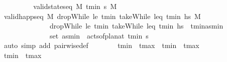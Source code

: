 \begin{isabellebody}
\ \ \ \ \ \ \isamarkupfalse%
\ \isamarkupfalse%
\ {\isachardoublequoteopen}valid{\isacharunderscore}{\kern0pt}state{\isacharunderscore}{\kern0pt}seq\ M\ {\isacharbrackleft}{\kern0pt}t\isactrlsub m\isactrlsub i\isactrlsub n{\isacharbrackright}{\kern0pt}\ {\isasympi}s\ M\isanewline
\ \ \ \ \ \ \ \ \isamarkupfalse%
\ {\isacartoucheopen}valid{\isacharunderscore}{\kern0pt}happ{\isacharunderscore}{\kern0pt}seq\ M\ {\isacharparenleft}{\kern0pt}dropWhile\ {\isacharparenleft}{\kern0pt}le\ t\isactrlsub m\isactrlsub i\isactrlsub n{\isacharparenright}{\kern0pt}\ {\isacharparenleft}{\kern0pt}takeWhile\ {\isacharparenleft}{\kern0pt}leq\ t\isactrlsub m\isactrlsub i\isactrlsub n{\isacharparenright}{\kern0pt}\ hs{\isacharparenright}{\kern0pt}{\isacharparenright}{\kern0pt}\ M\isanewline
\ \ \ \ \ \ \ \ \ \ \ \ \ \ {\isacartoucheopen}dropWhile\ {\isacharparenleft}{\kern0pt}le\ t\isactrlsub m\isactrlsub i\isactrlsub n{\isacharparenright}{\kern0pt}\ {\isacharparenleft}{\kern0pt}takeWhile\ {\isacharparenleft}{\kern0pt}leq\ t\isactrlsub m\isactrlsub i\isactrlsub n{\isacharparenright}{\kern0pt}\ hs{\isacharparenright}{\kern0pt}\ {\isacharequal}{\kern0pt}\ {\isacharbrackleft}{\kern0pt}{\isacharparenleft}{\kern0pt}t\isactrlsub m\isactrlsub i\isactrlsub n{\isacharcomma}{\kern0pt}as\isactrlsub m\isactrlsub i\isactrlsub n{\isacharparenright}{\kern0pt}{\isacharbrackright}{\kern0pt}{\isacartoucheclose}\ \isanewline
\ \ \ \ \ \ \ \ \ \ \ \ \ \ {\isacartoucheopen}set\ as\isactrlsub m\isactrlsub i\isactrlsub n\ {\isacharequal}{\kern0pt}\ acts{\isacharunderscore}{\kern0pt}of{\isacharunderscore}{\kern0pt}plan{\isacharunderscore}{\kern0pt}at\ t\isactrlsub m\isactrlsub i\isactrlsub n\ {\isasympi}s{\isacartoucheclose}\isanewline
\ \ \ \ \ \ \ \ \isamarkupfalse%
\ {\isacharparenleft}{\kern0pt}auto\ simp\ add{\isacharcolon}{\kern0pt}\ pairwise{\isacharunderscore}{\kern0pt}def{\isacharparenright}{\kern0pt}\isanewline
\isanewline
\ \ \ \ \ \ \isamarkupfalse%
\ {\isachardoublequoteopen}t\isactrlsub m\isactrlsub i\isactrlsub n\ {\isacharequal}{\kern0pt}\ t\isactrlsub m\isactrlsub a\isactrlsub x\ {\isasymor}\ t\isactrlsub m\isactrlsub i\isactrlsub n\ {\isacharless}{\kern0pt}\ t\isactrlsub m\isactrlsub a\isactrlsub x{\isachardoublequoteclose}\isanewline
\ \ \ \ \ \ \ \ \isamarkupfalse%
\ {\isacartoucheopen}t\isactrlsub m\isactrlsub i\isactrlsub n\ {\isasymle}\ t\isactrlsub m\isactrlsub a\isactrlsub x{\isacartoucheclose}\ \isamarkupfalse%

\end{isabellebody}

